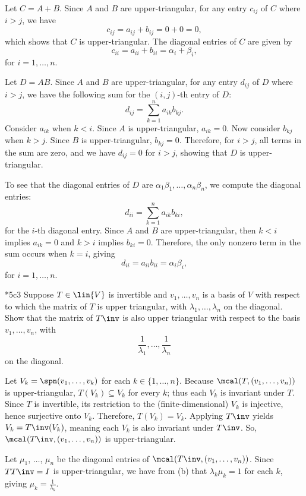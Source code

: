 \begin{solenum}
    \item Let $C = A + B$.
    Since $A$ and $B$ are upper-triangular, for any entry $c_{ij}$ of $C$ where $i > j$, we have
    \[
        c_{ij} = a_{ij} + b_{ij} = 0 + 0 = 0,
    \]
    which shows that $C$ is upper-triangular.
    The diagonal entries of $C$ are given by
    \[
        c_{ii} = a_{ii} + b_{ii} = \alpha_i + \beta_i,
    \]
    for $i = 1, \ldots, n$.
    \item Let $D = AB$. 
    Since $A$ and $B$ are upper-triangular, for any entry $d_{ij}$ of $D$ where $i > j$, we have the following sum for the $(i,j)$-th entry of $D$:
    \[
        d_{ij} = \sum_{k=1}^n a_{ik}b_{kj}.
    \]
    Consider $a_{ik}$ when $k < i$. Since $A$ is upper-triangular, $a_{ik} = 0$.
    Now consider $b_{kj}$ when $k > j$. Since $B$ is upper-triangular, $b_{kj} = 0$.
    Therefore, for $i > j$, all terms in the sum are zero, and we have $d_{ij} = 0$ for $i > j$, showing that $D$ is upper-triangular.

    To see that the diagonal entries of $D$ are $\alpha_1\beta_1, \ldots, \alpha_n\beta_n$, we compute the diagonal entries:
    \[
        d_{ii} = \sum_{k=1}^n a_{ik}b_{ki},
    \]
    for the $i$-th diagonal entry. Since $A$ and $B$ are upper-triangular, then $k < i$ implies $a_{ik} = 0$ and $k > i$ implies $b_{ki} = 0$. Therefore, the only nonzero term in the sum occurs when $k = i$, giving
    \[
        d_{ii} = a_{ii}b_{ii} = \alpha_i\beta_i,
    \]
    for $i = 1, \ldots, n$.
\end{solenum}

\begin{exercise}*{5c3}
    Suppose $T \in \lin{V}$ is invertible and $v_1, \ldots, v_n$ is a basis of $V$ with respect to which the matrix of $T$ is upper triangular, with $\lambda_1, \ldots, \lambda_n$ on the diagonal.
    Show that the matrix of $T\inv$ is also upper triangular with respect to the basis $v_1, \ldots, v_n$, with
    \[
        \frac{1}{\lambda_1}, \ldots, \frac{1}{\lambda_n}
    \]
    on the diagonal.
\end{exercise}

\begin{sol}
    Let $V_k=\spn(v_1, \dots, v_k)$ for each $k \in \{1, \dots, n\}$.
    Because $\mcal(T,(v_1,\dots,v_n))$ is upper-triangular, $T(V_k) \subseteq V_k$ for every $k$; thus each $V_k$ is invariant under $T$.
    Since $T$ is invertible, its restriction to the (finite-dimensional) $V_k$ is injective, hence surjective onto $V_k$.
    Therefore, $T(V_k)=V_k$. Applying $T\inv$ yields $V_k=T\inv (V_k)$, meaning each $V_k$ is also invariant under $T\inv$. So, $\mcal(T\inv, (v_1, \dots, v_n))$ is upper-triangular. 

    Let $\mu_1$, $\dots$, $\mu_n$ be the diagonal entries of $\mcal(T\inv, (v_1, \dots, v_n))$.
    Since $TT\inv=I$ is upper-triangular, we have from  (b) that $\lambda_k \mu_k=1$ for each $k$, giving $\mu_k=\frac{1}{\lambda_k}$.
\end{sol}

